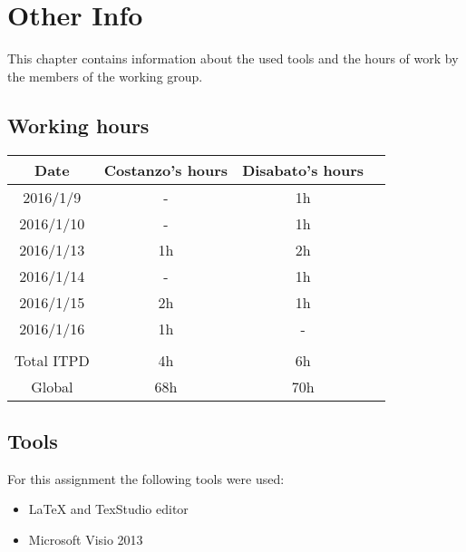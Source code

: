 \documentclass[\mainpath/main]{subfiles}
\begin{document}
\chapter{Other Info}
\label{OtherInfo}

\setmyfancystyle

This chapter contains information about the used tools and the hours of work by the members of the working group.

\section{Working hours}
\begin{table}[h!]
	\centering
\begin{tabular}{cccc}
\hline
Date     	& Costanzo's hours & Disabato's hours  & \\ \hline
2016/1/9 	& -			  	   & 1h 			   & \\ \hline
2016/1/10	& - 		  	   & 1h 			   & \\ \hline
2016/1/13	& 1h 		  	   & 2h 			   & \\ \hline
2016/1/14 	& - 		  	   & 1h 			   & \\ \hline
2016/1/15 	& 2h 		 	   & 1h 			   & \\ \hline
2016/1/16 	& 1h 		 	   & -	 			   & \\ \hline

\\
Total ITPD  & 4h 		 	   & 6h 			   & \\ \hline
Global 	    & 68h 		 	   & 70h 			   & \\ \hline

\end{tabular}
\end{table}

\clearpage

\section{Tools}
For this assignment the following tools were used:
\begin{itemize}
	\item \LaTeX{} and TexStudio editor
	\item Microsoft Visio 2013
\end{itemize}
\end{document}
